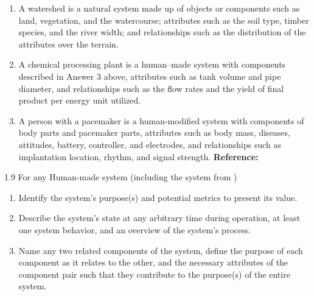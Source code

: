 \begin{exsol@solution}{}
        \begin{enumerate}[label=\alph*)]
            \item A watershed is a natural system made up of objects or components such as land, vegetation, and the watercourse; attributes such as the soil type, timber species, and the river width; and relationships such as the distribution of the attributes over the terrain.
            \item A chemical processing plant is a human–made system with components described in Answer 3 above, attributes such as tank volume and pipe diameter, and relationships such as the flow rates and the yield of final product per energy unit utilized.
            \item A person with a pacemaker is a human-modified system with components of body parts and pacemaker parts, attributes such as body mass, diseases, attitudes, battery, controller, and electrodes, and relationships such as implantation location, rhythm, and signal strength. \textbf{Reference:}
        \end{enumerate}
\end{exsol@solution}
\begin{exsol@exercise}{1.9}
    \label{sea-1-10_11_12}
        For any Human-made system (including the system from )
        \begin{enumerate}[label=\alph*)]
            \item Identify the system's purpose(s) and potential metrics to present its value.
            \item Describe the system's state at any arbitrary time during operation, at least one system behavior, and an overview of the system's process.
            \item Name any two related components of the system, define the purpose of each component as it relates to the other, and the necessary attributes of the component pair such that they contribute to the purpose(s) of the entire system.
        \end{enumerate}
\end{exsol@exercise}
